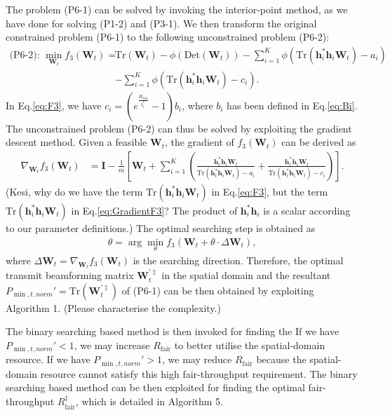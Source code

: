 \documentclass[12pt,draft,onecolumn,journal]{IEEEtran}
\begin{document}
The problem (P6-1) can be solved by invoking the interior-point method, as we have done for solving (P1-2) and (P3-1). We then transform the original constrained problem (P6-1) to the following unconstrained problem (P6-2):
\begin{align}
	\text{(P6-2): }  \min_{\mathbf{W}_t} f_3(\mathbf{W}_t) = &\text{Tr}(\mathbf{W}_t) - \phi(\text{Det}(\mathbf{W}_t)) - \sum_{i=1}^{K}\phi\left(\text{Tr}(\mathbf{h}_i^*\mathbf{h}_i\mathbf{W}_t) - a_i\right) \nonumber\\
	& - \sum_{i=1}^{K}\phi\left(\text{Tr}(\mathbf{h}_i^*\mathbf{h}_i\mathbf{W}_t) - c_i\right). \label{eq:F3}
\end{align}
In Eq.\eqref{eq:F3}, we have $c_i = (e^{\frac{R_{\text{fair}}}{t_i^U}} - 1)b_i$, where $b_i$ has been defined in Eq.\eqref{eq:Bi}. The unconstrained problem (P6-2) can thus be solved by exploiting the gradient descent method. Given a feasible $\mathbf{W}_t$, the gradient of $f_3(\mathbf{W}_t)$ can be derived as
\begin{align}
	\nabla_{\mathbf{W}_t}f_3(\mathbf{W}_t) &= \mathbf{I} - \frac{1}{m}\left[\mathbf{W}_t + \sum_{i=1}^K\left(\frac{\mathbf{h}_i^*\mathbf{h}_i\mathbf{W}_t}{\text{Tr}(\mathbf{h}_i^*\mathbf{h}_i\mathbf{W}_t)-a_i} + \frac{\mathbf{h}_i^*\mathbf{h}_i\mathbf{W}_t}{\text{Tr}(\mathbf{h}_i^*\mathbf{h}_i\mathbf{W}_t)-c_i}\right)\right]. \label{eq:GradientF3}
\end{align}
{\color{red} (Kesi, why do we have the term $\text{Tr}(\mathbf{h}_i^*\mathbf{h}_i\mathbf{W}_t)$ in Eq.\eqref{eq:F3}, but the term $\text{Tr}(\mathbf{h}_i^*\mathbf{h}_i\mathbf{W}_t)$ in Eq.\eqref{eq:GradientF3}? The product of $\mathbf{h}_i^*\mathbf{h}_i$ is a scalar according to our parameter definitions.)} The optimal searching step is obtained as
\begin{align}
	\theta = \arg \min_{\theta} f_3(\mathbf{W}_t + \theta\cdot \Delta \mathbf{W}_t), \label{eq:SearchStepF3}
\end{align}
where $\Delta \mathbf{W}_t = \nabla_{\mathbf{W}_t}f_3(\mathbf{W}_t)$ is the searching direction. Therefore, the optimal transmit beamforming matrix $\mathbf{W}_{t}^{'\ddagger}$ in the spatial domain and the resultant $P_{\min, t,norm}' = \text{Tr}(\mathbf{W}_{t}^{'\ddagger})$ of (P6-1) can be then obtained by exploiting Algorithm 1. {\color{red} (Please characterise the complexity.)}

The binary searching based method is then invoked for finding the If we have $P_{\min, t,norm}' < 1$, we may increase $R_{\text{fair}}$ to better utilise the spatial-domain resource. If we have $P_{\min, t,norm}' > 1$, we may reduce $R_{\text{fair}}$ because the spatial-domain resource cannot satisfy this high fair-throughput requirement. The binary searching based method can be then exploited for finding the optimal fair-throughput $R_{\text{fair}}^{\ddagger}$, which is detailed in Algorithm 5. 
\end{document}
